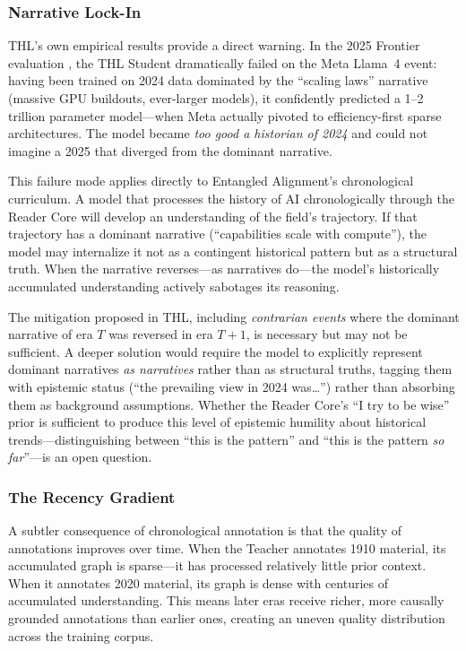 \subsubsection{Narrative Lock-In}

THL's own empirical results provide a direct warning. In the 2025 Frontier evaluation \cite{westerberg2026thl}, the THL Student dramatically failed on the Meta Llama~4 event: having been trained on 2024 data dominated by the ``scaling laws'' narrative (massive GPU buildouts, ever-larger models), it confidently predicted a 1--2 trillion parameter model---when Meta actually pivoted to efficiency-first sparse architectures. The model became \emph{too good a historian of 2024} and could not imagine a 2025 that diverged from the dominant narrative.

This failure mode applies directly to Entangled Alignment's chronological curriculum. A model that processes the history of AI chronologically through the Reader Core will develop an understanding of the field's trajectory. If that trajectory has a dominant narrative (``capabilities scale with compute''), the model may internalize it not as a contingent historical pattern but as a structural truth. When the narrative reverses---as narratives do---the model's historically accumulated understanding actively sabotages its reasoning.

The mitigation proposed in THL, including \emph{contrarian events} where the dominant narrative of era $T$ was reversed in era $T+1$, is necessary but may not be sufficient. A deeper solution would require the model to explicitly represent dominant narratives \emph{as narratives} rather than as structural truths, tagging them with epistemic status (``the prevailing view in 2024 was\ldots'') rather than absorbing them as background assumptions. Whether the Reader Core's ``I try to be wise'' prior is sufficient to produce this level of epistemic humility about historical trends---distinguishing between ``this is the pattern'' and ``this is the pattern \emph{so far}''---is an open question.

\subsubsection{The Recency Gradient}

A subtler consequence of chronological annotation is that the quality of annotations improves over time. When the Teacher annotates 1910 material, its accumulated graph is sparse---it has processed relatively little prior context. When it annotates 2020 material, its graph is dense with centuries of accumulated understanding. This means later eras receive richer, more causally grounded annotations than earlier ones, creating an uneven quality distribution across the training corpus.

